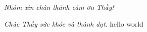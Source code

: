 \documentclass[12pt, a4paper, oneside]{article}
\begin{document}
\textit{Nhóm xin chân thành cảm ơn Thầy!}

\textit{Chúc Thầy sức khỏe và thành đạt.}
\newpage
\setcounter{page}{1}
hello world
\newpage
\newpage
\newpage
\newpage
\newpage
\newpage
\end{document}
